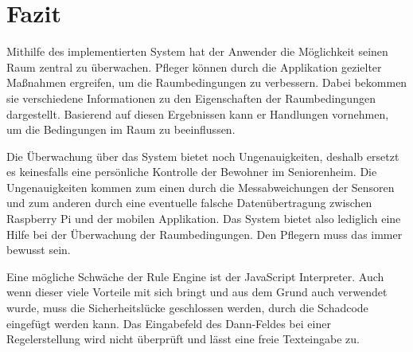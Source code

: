 \chapter{Fazit}

Mithilfe des implementierten System hat der Anwender die Möglichkeit seinen Raum zentral zu überwachen. Pfleger können durch die Applikation gezielter Maßnahmen ergreifen, um die Raumbedingungen zu verbessern. Dabei bekommen sie verschiedene Informationen zu den Eigenschaften der Raumbedingungen dargestellt. Basierend auf diesen Ergebnissen kann er Handlungen vornehmen, um die Bedingungen im Raum zu beeinflussen.
 
Die Überwachung über das System bietet noch Ungenauigkeiten, deshalb ersetzt es keinesfalls eine persönliche Kontrolle der Bewohner im Seniorenheim. Die Ungenauigkeiten kommen zum einen durch die Messabweichungen der Sensoren und zum anderen durch eine eventuelle falsche Datenübertragung zwischen Raspberry Pi und der mobilen Applikation. Das System bietet also lediglich eine Hilfe bei der Überwachung der Raumbedingungen. Den Pflegern muss das immer bewusst sein.

Eine mögliche Schwäche der Rule Engine ist der JavaScript Interpreter. Auch wenn dieser viele Vorteile mit sich bringt und aus dem Grund auch verwendet wurde, muss die Sicherheitslücke geschlossen werden, durch die Schadcode eingefügt werden kann. Das Eingabefeld des Dann-Feldes bei einer Regelerstellung wird nicht überprüft und lässt eine freie Texteingabe zu. 